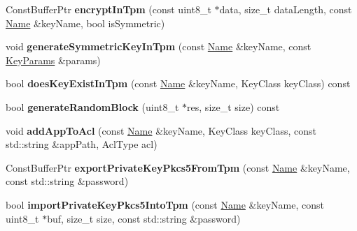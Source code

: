 \begin{DoxyCompactItemize}
\item 
Const\+Buffer\+Ptr {\bfseries encrypt\+In\+Tpm} (const uint8\+\_\+t $\ast$data, size\+\_\+t data\+Length, const \hyperlink{classndn_1_1Name}{Name} \&key\+Name, bool is\+Symmetric)\hypertarget{classndn_1_1security_1_1KeyChain_a0c5e6d1b1e292982f3a4812eb2587024}{}\label{classndn_1_1security_1_1KeyChain_a0c5e6d1b1e292982f3a4812eb2587024}

\item 
void {\bfseries generate\+Symmetric\+Key\+In\+Tpm} (const \hyperlink{classndn_1_1Name}{Name} \&key\+Name, const \hyperlink{classndn_1_1KeyParams}{Key\+Params} \&params)\hypertarget{classndn_1_1security_1_1KeyChain_aef589f964d340ce194e14798a930c471}{}\label{classndn_1_1security_1_1KeyChain_aef589f964d340ce194e14798a930c471}

\item 
bool {\bfseries does\+Key\+Exist\+In\+Tpm} (const \hyperlink{classndn_1_1Name}{Name} \&key\+Name, Key\+Class key\+Class) const\hypertarget{classndn_1_1security_1_1KeyChain_a5be2a386d09a5baf48d5db8118fe75b8}{}\label{classndn_1_1security_1_1KeyChain_a5be2a386d09a5baf48d5db8118fe75b8}

\item 
bool {\bfseries generate\+Random\+Block} (uint8\+\_\+t $\ast$res, size\+\_\+t size) const\hypertarget{classndn_1_1security_1_1KeyChain_a4500c459f7ad727d2fa1fb3536d8cef3}{}\label{classndn_1_1security_1_1KeyChain_a4500c459f7ad727d2fa1fb3536d8cef3}

\item 
void {\bfseries add\+App\+To\+Acl} (const \hyperlink{classndn_1_1Name}{Name} \&key\+Name, Key\+Class key\+Class, const std\+::string \&app\+Path, Acl\+Type acl)\hypertarget{classndn_1_1security_1_1KeyChain_a57a91a8674a6ed3fe409d6cd0ec93dba}{}\label{classndn_1_1security_1_1KeyChain_a57a91a8674a6ed3fe409d6cd0ec93dba}

\item 
Const\+Buffer\+Ptr {\bfseries export\+Private\+Key\+Pkcs5\+From\+Tpm} (const \hyperlink{classndn_1_1Name}{Name} \&key\+Name, const std\+::string \&password)\hypertarget{classndn_1_1security_1_1KeyChain_acbe5f444ac8d50b7baa624206f2adde5}{}\label{classndn_1_1security_1_1KeyChain_acbe5f444ac8d50b7baa624206f2adde5}

\item 
bool {\bfseries import\+Private\+Key\+Pkcs5\+Into\+Tpm} (const \hyperlink{classndn_1_1Name}{Name} \&key\+Name, const uint8\+\_\+t $\ast$buf, size\+\_\+t size, const std\+::string \&password)\hypertarget{classndn_1_1security_1_1KeyChain_a6984294da1cd5e4d10e5871b0e180cc5}{}\label{classndn_1_1security_1_1KeyChain_a6984294da1cd5e4d10e5871b0e180cc5}

\end{DoxyCompactItemize}
